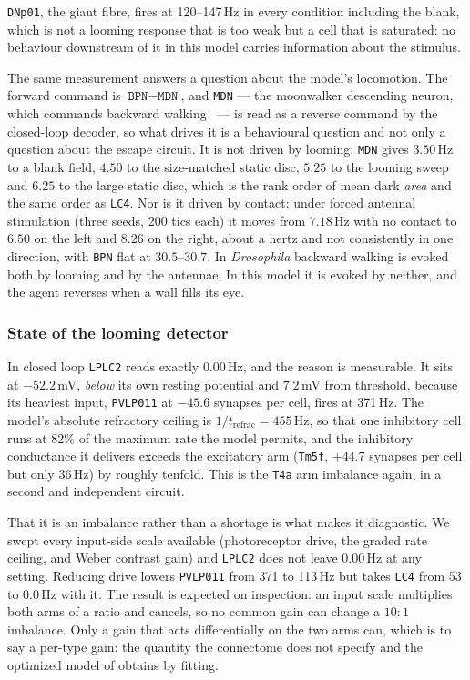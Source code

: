 \documentclass[10pt,twoside]{article}
\newcommand{\cell}[1]{\texttt{#1}}
\begin{document}
\cell{DNp01}, the giant fibre, fires at 120--147\,Hz in every condition
including the blank, which is not a looming response that is too weak but a
cell that is saturated: no behaviour downstream of it in this model carries
information about the stimulus.

The same measurement answers a question about the model's locomotion. The
forward command is $\cell{BPN}-\cell{MDN}$, and \cell{MDN} --- the moonwalker
descending neuron, which commands backward walking~\citep{bidaye2014} --- is
read as a reverse command by the closed-loop decoder, so what drives it is a
behavioural question and not only a question about the escape circuit. It is
not driven by looming: \cell{MDN} gives $3.50$\,Hz to a blank field, $4.50$ to
the size-matched static disc, $5.25$ to the looming sweep and $6.25$ to the
large static disc, which is the rank order of mean dark \emph{area} and the
same order as \cell{LC4}. Nor is it driven by contact: under forced antennal
stimulation (three seeds, 200 tics each) it moves from $7.18$\,Hz with no
contact to $6.50$ on the left and $8.26$ on the right, about a hertz and not
consistently in one direction, with \cell{BPN} flat at $30.5$--$30.7$. In
\emph{Drosophila} backward walking is evoked both by looming and by the
antennae. In this model it is evoked by neither, and the agent reverses when a
wall fills its eye.

\subsubsection*{State of the looming detector}
In closed loop \cell{LPLC2} reads exactly $0.00$\,Hz, and the reason is
measurable. It sits at $-52.2$\,mV, \emph{below} its own resting potential
and $7.2$\,mV from threshold, because its heaviest input, \cell{PVLP011} at
$-45.6$ synapses per cell, fires at 371\,Hz. The model's absolute refractory
ceiling is $1/t_{\mathrm{refrac}}=455$\,Hz, so that one inhibitory cell runs at
82\% of the maximum rate the model permits, and the inhibitory conductance it
delivers exceeds the excitatory arm (\cell{Tm5f}, $+44.7$ synapses per cell but
only 36\,Hz) by roughly tenfold. This is the \cell{T4a} arm imbalance again, in
a second and independent circuit.

That it is an imbalance rather than a shortage is what makes it diagnostic. We
swept every input-side scale available (photoreceptor drive, the graded rate
ceiling, and Weber contrast gain) and \cell{LPLC2} does not leave $0.00$\,Hz
at any setting. Reducing drive lowers \cell{PVLP011} from 371 to 113\,Hz but
takes \cell{LC4} from 53 to $0.0$\,Hz with it. The result is expected on
inspection: an input scale multiplies both arms of a ratio and cancels, so no
common gain can change a $10\!:\!1$ imbalance. Only a gain that acts
differentially on the two arms can, which is to say a per-type gain: the
quantity the connectome does not specify and the optimized model of
\citet{lappalainen2024} obtains by fitting.
\end{document}
